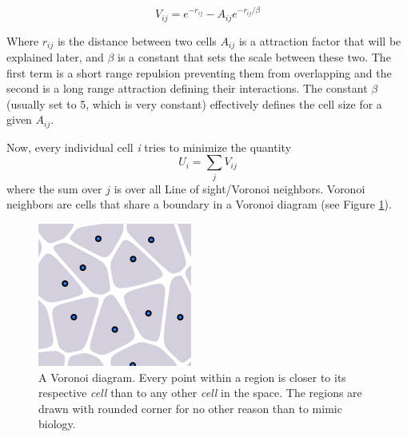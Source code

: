 \begin{equation}
    V_{ij}=e^{-r_{ij}}-A_{ij} e^{-r_{ij}/\beta}
    \label{eq:main-pot}
\end{equation}

Where $r_{ij}$ is the distance between two cells $A_{ij}$ is a attraction factor that will be explained later, and $\beta$ is a constant that sets the scale between these two. The first term is a short range repulsion preventing them from overlapping and the second is a long range attraction defining their interactions. The constant $\beta$ (usually set to 5, which is very constant) effectively defines the cell size for a given $A_{ij}$. 

Now, every individual cell \textit{i} tries to minimize the quantity 
\begin{equation}
    U_i = \sum_j V_{ij}
    \label{eq:totalPot}
\end{equation}
where the sum over $j$ is over all Line of sight/Voronoi neighbors. Voronoi neighbors are cells that share a boundary in a Voronoi diagram (see Figure \ref{fig:voronoi-explanation}). 

\begin{figure}
    \centering
    \includegraphics[width=0.3\linewidth]{chapters//Theory//figures/voronoi_explanation.png}
    \caption{A Voronoi diagram. Every point within a region is closer to its respective \textit{cell} than to any other \textit{cell} in the space. The regions are drawn with rounded corner for no other reason than to mimic biology.}
    \label{fig:voronoi-explanation}
\end{figure}
\\

